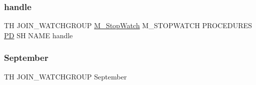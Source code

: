 \subsubsection{\texorpdfstring{handle}{handle}}
{\footnotesize\ttfamily TH J\+O\+I\+N\+\_\+\+W\+A\+T\+C\+H\+G\+R\+O\+UP \hyperlink{option__stopwatch_83_8txt_aa2011fc45a5e502e87ee50996a8a9305}{M\+\_\+\+Stop\+Watch} M\+\_\+\+S\+T\+O\+P\+W\+A\+T\+CH P\+R\+O\+C\+E\+D\+U\+R\+ES \hyperlink{what__overview_81_8txt_a85f26da5a4481fbdb0d9c79f2b94de3e}{PD} SH N\+A\+ME handle}

\mbox{\label{join__watchgroup_83_8txt_ab585e085cf3d3bd96c1d9e01f9a0839b}} 
\subsubsection{\texorpdfstring{September}{September}}
{\footnotesize\ttfamily TH J\+O\+I\+N\+\_\+\+W\+A\+T\+C\+H\+G\+R\+O\+UP September}

